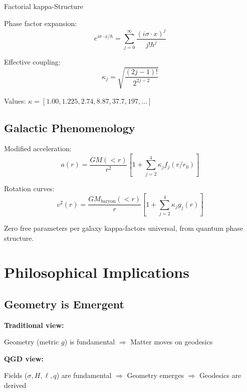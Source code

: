 \documentclass[11pt,a4paper]{article}
\theoremstyle{definition}
\theoremstyle{remark}
\begin{document}
		Factorial kappa-Structure
		
		Phase factor expansion:
		\begin{equation}
			e^{i\sigma \cdot x/\hbar} = \sum_{j=0}^\infty \frac{(i\sigma \cdot x)^j}{j!\hbar^j}
		\end{equation}
		
		Effective coupling:
		\begin{equation}
			\kappa_j = \sqrt{\frac{(2j-1)!}{2^{2j-2}}}
		\end{equation}
		
		Values: $\kappa = [1.00, 1.225, 2.74, 8.87, 37.7, 197, ...]$
		
		\subsection{Galactic Phenomenology}
		
		Modified acceleration:
		\begin{equation}
			a(r) = \frac{GM(<r)}{r^2}\left[1 + \sum_{j=2}^4 \kappa_j f_j(r/r_0)\right]
		\end{equation}
		
		Rotation curves:
		\begin{equation}
			v^2(r) = \frac{GM_{\text{baryon}}(<r)}{r}\left[1 + \sum_{j=2}^4 \kappa_j g_j(r)\right]
		\end{equation}
		
		Zero free parameters per galaxy kappa-factors universal, from quantum phase structure.
		
		\section{Philosophical Implications}
		
		\subsection{Geometry is Emergent}
		
		\textbf{Traditional view:}
		\begin{center}
			Geometry (metric $g$) is fundamental $\Rightarrow$ Matter moves on geodesics
		\end{center}
		
		\textbf{QGD view:}
		\begin{center}
			Fields ($\sigma, H, \ell, q$) are fundamental $\Rightarrow$ Geometry emerges $\Rightarrow$ Geodesics are derived
		\end{center}
		
\end{document}
